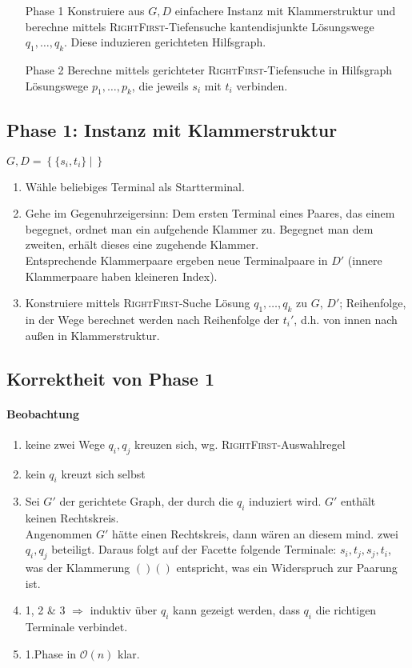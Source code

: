 \documentclass{article}
\renewcommand{\O}[1]{\mathcal{O}\left(#1\right)}
\newcommand{\set}[2]{\left\lbrace #1~|~#2 \right\rbrace}
\begin{document}
\begin{enumerate}
	\item[Phase 1] Konstruiere aus $G, D$ einfachere Instanz mit Klammerstruktur und berechne mittels \textsc{RightFirst}-Tiefensuche kantendisjunkte Lösungswege $q_1, \ldots, q_k$. Diese induzieren gerichteten Hilfsgraph.
	\item[Phase 2] Berechne mittels gerichteter \textsc{RightFirst}-Tiefensuche in Hilfsgraph Lösungswege $p_1,\ldots, p_k$, die jeweils $s_i$ mit $t_i$ verbinden.
\end{enumerate}

\subsection{Phase 1: Instanz mit Klammerstruktur}
$G, D = \set{\{s_i,t_i\}}{}$
\begin{enumerate}
	\item Wähle beliebiges Terminal als Startterminal.
	\item Gehe im Gegenuhrzeigersinn: Dem ersten Terminal eines Paares, das einem begegnet, ordnet man ein aufgehende Klammer zu. Begegnet man dem zweiten, erhält dieses eine zugehende Klammer.\\
	Entsprechende Klammerpaare ergeben neue Terminalpaare in $D'$ (innere Klammerpaare haben kleineren Index).
	\item Konstruiere mittels \textsc{RightFirst}-Suche Lösung $q_1,\ldots, q_k$ zu $G$, $D'$; Reihenfolge, in der Wege berechnet werden nach Reihenfolge der $t_i'$, d.h. von innen nach außen in Klammerstruktur.
\end{enumerate}

\subsection{Korrektheit von Phase 1}
\paragraph{Beobachtung} 
\begin{enumerate}
	\item keine zwei Wege $q_i, q_j$ kreuzen sich, wg. \textsc{RightFirst}-Auswahlregel
	\item kein $q_i$ kreuzt sich selbst
	\item Sei $G'$ der gerichtete Graph, der durch die $q_i$ induziert wird. $G'$ enthält keinen Rechtskreis.\\
	Angenommen $G'$ hätte einen Rechtskreis, dann wären an diesem mind. zwei $q_i, q_j$ beteiligt. Daraus folgt auf der Facette folgende Terminale: $s_i, t_j, s_j, t_i$, was der Klammerung $()()$ entspricht, was ein Widerspruch zur Paarung ist.\\
	\item 1, 2 \& 3 $\Longrightarrow$ induktiv über $q_i$ kann gezeigt werden, dass $q_i$ die richtigen Terminale verbindet.
	\item 1.Phase in $\O{n}$ klar.
\end{enumerate}
\end{document}
